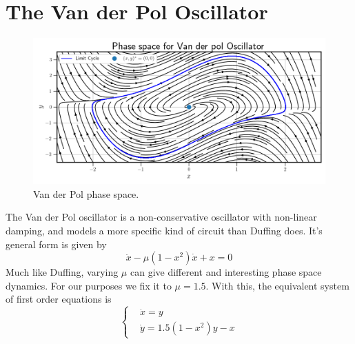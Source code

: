 \section{The Van der Pol Oscillator}
\label{section:van der pol results}

\begin{figure}[ht]
    \centering
    \begin{minipage}{\textwidth}
        \includegraphics[width=\textwidth]{"Figures/van_der_pol_phase_space.png"} 
    \end{minipage}
    \caption{Van der Pol phase space.}
    \label{fig:van der pol phase space}
\end{figure}

The Van der Pol oscillator is a non-conservative oscillator with non-linear damping, and models a more 
specific kind of circuit than Duffing does. It's general form is given by 
\begin{equation}
    \ddot{x} - \mu(1 - x^2)\dot{x} + x = 0
\end{equation}
Much like Duffing, varying $\mu$ can give different and interesting phase space dynamics. For our
purposes we fix it to $\mu = 1.5$. With this, the equivalent system of first order equations
is 
\begin{equation}
    \begin{cases}
        & \dot{x} = y \\
        & \dot{y} = 1.5(1 - x^2)y - x  
    \end{cases}
\end{equation}

